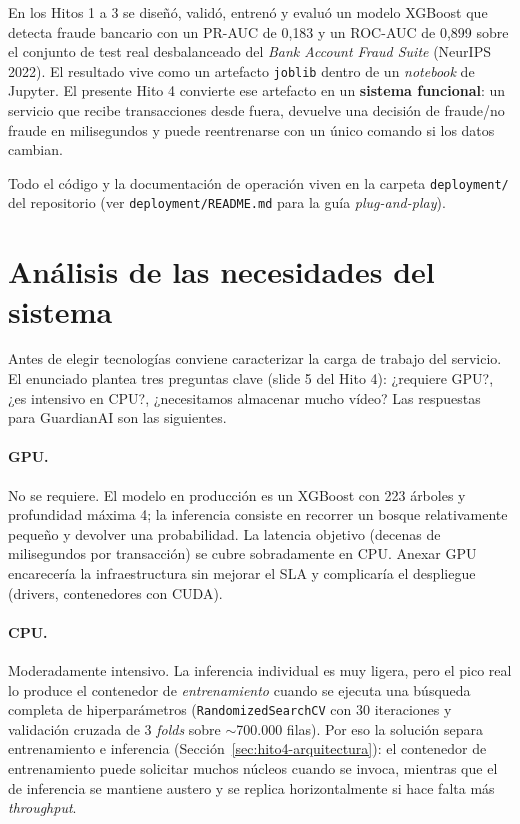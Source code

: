\documentclass[12pt,a4paper]{report}
\begin{document}
\vspace{0.5cm}

En los Hitos 1 a 3 se diseñó, validó, entrenó y evaluó un modelo XGBoost que detecta fraude bancario con un PR-AUC de 0{,}183 y un ROC-AUC de 0{,}899 sobre el conjunto de test real desbalanceado del \textit{Bank Account Fraud Suite} (NeurIPS 2022). El resultado vive como un artefacto \texttt{joblib} dentro de un \textit{notebook} de Jupyter. El presente Hito 4 convierte ese artefacto en un \textbf{sistema funcional}: un servicio que recibe transacciones desde fuera, devuelve una decisión de fraude/no fraude en milisegundos y puede reentrenarse con un único comando si los datos cambian.

Todo el código y la documentación de operación viven en la carpeta \texttt{deployment/} del repositorio (ver \texttt{deployment/README.md} para la guía \textit{plug-and-play}).

\section{Análisis de las necesidades del sistema}
\label{sec:hito4-necesidades}

Antes de elegir tecnologías conviene caracterizar la carga de trabajo del servicio. El enunciado plantea tres preguntas clave (slide 5 del Hito 4): ¿requiere GPU?, ¿es intensivo en CPU?, ¿necesitamos almacenar mucho vídeo? Las respuestas para GuardianAI son las siguientes.

\paragraph{GPU.} No se requiere. El modelo en producción es un XGBoost con 223 árboles y profundidad máxima 4; la inferencia consiste en recorrer un bosque relativamente pequeño y devolver una probabilidad. La latencia objetivo (decenas de milisegundos por transacción) se cubre sobradamente en CPU. Anexar GPU encarecería la infraestructura sin mejorar el SLA y complicaría el despliegue (drivers, contenedores con CUDA).

\paragraph{CPU.} Moderadamente intensivo. La inferencia individual es muy ligera, pero el pico real lo produce el contenedor de \textit{entrenamiento} cuando se ejecuta una búsqueda completa de hiperparámetros (\texttt{RandomizedSearchCV} con 30 iteraciones y validación cruzada de 3 \textit{folds} sobre $\sim$700.000 filas). Por eso la solución separa entrenamiento e inferencia (Sección~\ref{sec:hito4-arquitectura}): el contenedor de entrenamiento puede solicitar muchos núcleos cuando se invoca, mientras que el de inferencia se mantiene austero y se replica horizontalmente si hace falta más \textit{throughput}.
\end{document}
